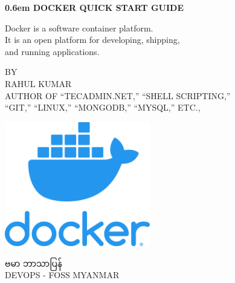 \documentclass{article}
\begin{document}

\clearpage
\newcommand\nbvspace[1][3]{\vspace*{\stretch{#1}}}
\newcommand\nbstretchyspace{\spaceskip0.5em plus 0.25em minus 0.25em}
\newcommand{\nbtitlestretch}{\spaceskip0.6em}
\pagestyle{empty}
\begin{center}
\bfseries
\nbvspace[1]
\Huge
{\nbtitlestretch\huge
DOCKER QUICK START GUIDE}

\nbvspace[1]
\normalsize

Docker is a software container platform. \\
It is an open platform for developing, shipping, \\
and running applications. 
\nbvspace[1]

\small BY\\
\Large RAHUL KUMAR\\[0.5em]
\footnotesize AUTHOR OF ``TECADMIN.NET,'' ``SHELL SCRIPTING,'' \\
``GIT,'' ``LINUX,'' ``MONGODB,'' ``MYSQL,'' ETC.,

\nbvspace[2]

\includegraphics[width=2.5in]{./docker.png}
\nbvspace[3]
\normalsize

ဗမာ ဘာသာပြန်\\
\large
DEVOPS - FOSS MYANMAR
\nbvspace[1]
\end{center}


\pagebreak
\end{document}
